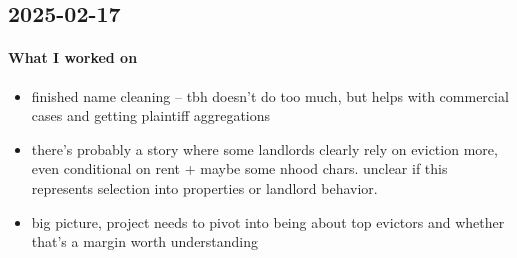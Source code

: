 \subsection{2025-02-17}

\paragraph{What I worked on}
\begin{itemize}
    \item finished name cleaning -- tbh doesn't do too much, but helps with commercial cases and getting plaintiff aggregations
    \item there's probably a story where some landlords clearly rely on eviction more, even conditional on rent + maybe some nhood chars. unclear if this represents selection into properties or landlord behavior.
    \item big picture, project needs to pivot into being about top evictors and whether that's a margin worth understanding
\end{itemize}

